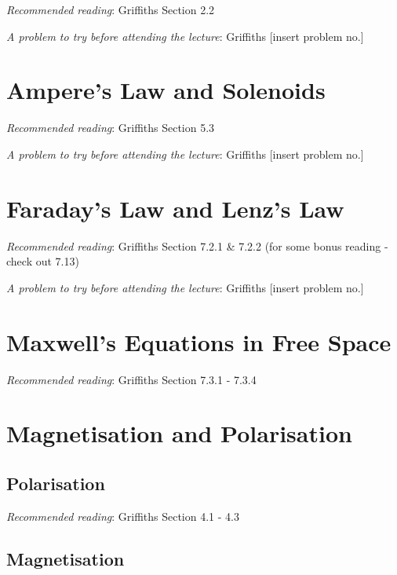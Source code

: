 \documentclass[
  letterpaper,
  DIV=11,
  numbers=noendperiod]{scrreprt}
\begin{document}
\emph{Recommended reading}: Griffiths Section 2.2

\emph{A problem to try before attending the lecture}: Griffiths
{[}insert problem no.{]}


\chapter{Ampere's Law and Solenoids}\label{amperes-law-and-solenoids}

\emph{Recommended reading}: Griffiths Section 5.3

\emph{A problem to try before attending the lecture}: Griffiths
{[}insert problem no.{]}


\chapter{Faraday's Law and Lenz's Law}\label{faradays-law-and-lenzs-law}

\emph{Recommended reading}: Griffiths Section 7.2.1 \& 7.2.2 (for some
bonus reading - check out 7.13)

\emph{A problem to try before attending the lecture}: Griffiths
{[}insert problem no.{]}


\chapter{Maxwell's Equations in Free
Space}\label{maxwells-equations-in-free-space}

\emph{Recommended reading}: Griffiths Section 7.3.1 - 7.3.4


\chapter{Magnetisation and
Polarisation}\label{magnetisation-and-polarisation}

\section{Polarisation}\label{polarisation}

\emph{Recommended reading}: Griffiths Section 4.1 - 4.3

\section{Magnetisation}\label{magnetisation}
\end{document}
